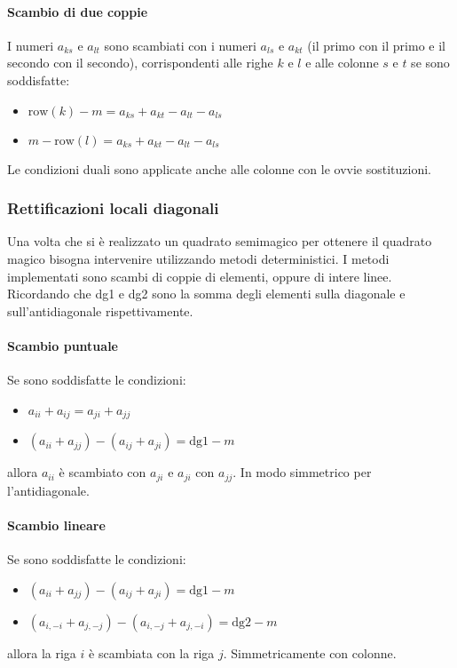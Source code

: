 \documentclass[italian,twoside,twocolumn]{article}
\begin{document}
\paragraph{Scambio di due coppie} I numeri $ a_{ks} $ e $ a_{lt} $ sono scambiati con i numeri $ a_{ls} $ e $ a_{kt} $ (il primo con il primo e il secondo con il secondo), corrispondenti alle righe $ k $ e $ l $ e alle colonne $ s $ e $ t $ se sono soddisfatte:
\begin{itemize}
	\item $ \text{row}(k) - \mathit{m} = a_{ks} + a_{kt} -a_{lt} - a_{ls} $
	\item $ \mathit{m} - \text{row}(l) = a_{ks} + a_{kt} -a_{lt} - a_{ls} $
\end{itemize}

Le condizioni duali sono applicate anche alle colonne con le ovvie sostituzioni.  

\subsubsection{Rettificazioni locali diagonali}
Una volta che si è realizzato un quadrato semimagico per ottenere il quadrato magico bisogna intervenire utilizzando metodi deterministici. 
I metodi implementati sono scambi di coppie di elementi, oppure di intere linee. Ricordando che dg1 e dg2 sono la somma degli elementi sulla diagonale e sull'antidiagonale rispettivamente. 

\paragraph{Scambio puntuale} 
Se sono soddisfatte le condizioni:
\begin{itemize}
	\item $ a_{ii} + a_{ij} = a_{ji} + a_{jj} $
	\item $ \left(a_{ii} +  a_{jj} \right) - \left(a_{ij} +  a_{ji} \right) = \text{dg1} - \mathit{m}$
\end{itemize}
allora $ a_{ii} $ è scambiato con $ a_{ji} $ e $ a_{ji} $ con $ a_{jj} $. In modo simmetrico per l'antidiagonale.

\paragraph{Scambio lineare}
Se sono soddisfatte le condizioni:
\begin{itemize}
	\item $ \left(a_{ii} +  a_{jj} \right) - \left(a_{ij} +  a_{ji} \right) = \text{dg1} - \mathit{m}$
	\item $ \left(a_{i,-i} + a_{j,-j}\right) - \left(a_{i,-j} + a_{j,-i}\right) = \text{dg2} - \mathit{m}$
\end{itemize}
allora la riga $ i $ è scambiata con la riga $ j $. Simmetricamente con colonne.
\end{document}
